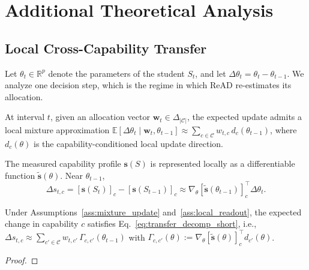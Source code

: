 \section{Additional Theoretical Analysis}\label{sec:app_theory}

\subsection{Local Cross-Capability Transfer}
\label{subsec:theory_transfer_short}

Let $\theta_t\in\mathbb{R}^p$ denote the parameters of the student $S_t$, and let $\Delta\theta_t=\theta_t-\theta_{t-1}$. We analyze one decision step, which is the regime in which ReAD re-estimates its allocation.

\begin{assumption}\label{ass:mixture_update}
At interval $t$, given an allocation vector $\mathbf{w}_t\in\Delta_{|\mathcal{C}|}$, the expected update admits a local mixture approximation $\mathbb{E}[\Delta\theta_t\mid \mathbf{w}_t,\theta_{t-1}]
\approx
\sum_{c\in\mathcal{C}} w_{t,c}\,d_c(\theta_{t-1})$, where $d_c(\theta)$ is the capability-conditioned local update direction.
\end{assumption}

\begin{assumption}\label{ass:local_readout}
The measured capability profile $\mathbf{s}(S)$ is represented locally as a differentiable function $\tilde{\mathbf{s}}(\theta)$. Near $\theta_{t-1}$,
\begin{equation}
\Delta s_{t,c}
=
[\mathbf{s}(S_t)]_c-[\mathbf{s}(S_{t-1})]_c
\approx
\nabla_\theta[\tilde{\mathbf{s}}(\theta_{t-1})]_c^\top\Delta\theta_t.
\label{eq:local_linear_short}
\end{equation}
\end{assumption}

\begin{proposition}\label{prop:transfer}
Under Assumptions~\ref{ass:mixture_update} and~\ref{ass:local_readout}, the expected change in capability $c$ satisfies Eq.~\eqref{eq:transfer_decomp_short}, i.e.,
$\Delta s_{t,c}\approx\sum_{c'\in\mathcal{C}} w_{t,c'}\,\Gamma_{c,c'}(\theta_{t-1})$ with
$\Gamma_{c,c'}(\theta):=\nabla_\theta[\tilde{\mathbf{s}}(\theta)]_c^\top d_{c'}(\theta)$.
\end{proposition}
\begin{proof}
\end{proof}

